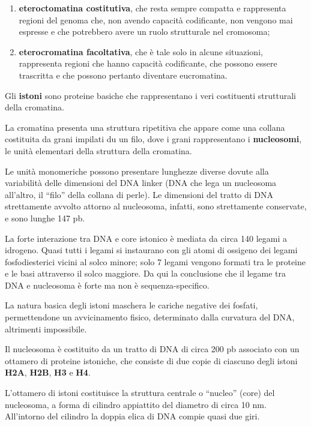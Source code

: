 \documentclass[11pt]{book}
\begin{document}
\begin{enumerate}
\def\labelenumi{\arabic{enumi}.}
\itemsep1pt\parskip0pt
\item
  \textbf{eteroctomatina costitutiva}, che resta sempre compatta e
  rappresenta regioni del genoma che, non avendo capacità codificante,
  non vengono mai espresse e che potrebbero avere un ruolo strutturale
  nel cromosoma;
\item
  \textbf{eterocromatina facoltativa}, che è tale solo in alcune
  situazioni, rappresenta regioni che hanno capacità codificante, che
  possono essere trascritta e che possono pertanto diventare
  eucromatina.
\end{enumerate}

Gli \textbf{istoni} sono proteine basiche che rappresentano i veri
costituenti strutturali della cromatina.

La cromatina presenta una struttura ripetitiva che appare come una
collana costituita da grani impilati du un filo, dove i grani
rappresentano i \textbf{nucleosomi}, le unità elementari della struttura
della cromatina.

Le unità monomeriche possono presentare lunghezze diverse dovute alla
variabilità delle dimensioni del DNA linker (DNA che lega un nucleosoma
all'altro, il ``filo'' della collana di perle). Le dimensioni del tratto
di DNA strettamente avvolto attorno al nucleosoma, infatti, sono
strettamente conservate, e sono lunghe 147 pb.

La forte interazione tra DNA e core istonico è mediata da circa 140
legami a idrogeno. Quasi tutti i legami si instaurano con gli atomi di
ossigeno dei legami fosfodiesterici vicini al solco minore; solo 7
legami vengono formati tra le proteine e le basi attraverso il solco
maggiore. Da qui la conclusione che il legame tra DNA e nucleosoma è
forte ma non è sequenza-specifico.

La natura basica degli istoni maschera le cariche negative dei fosfati,
permettendone un avvicinamento fisico, determinato dalla curvatura del
DNA, altrimenti impossibile.

Il nucleosoma è costituito da un tratto di DNA di circa 200 pb associato
con un ottamero di proteine istoniche, che consiste di due copie di
ciascuno degli istoni \textbf{H2A}, \textbf{H2B}, \textbf{H3} e
\textbf{H4}.

L'ottamero di istoni costituisce la struttura centrale o ``nucleo''
(core) del nucleosoma, a forma di cilindro appiattito del diametro di
circa 10 nm. All'intorno del cilindro la doppia elica di DNA compie
quasi due giri.
\end{document}
